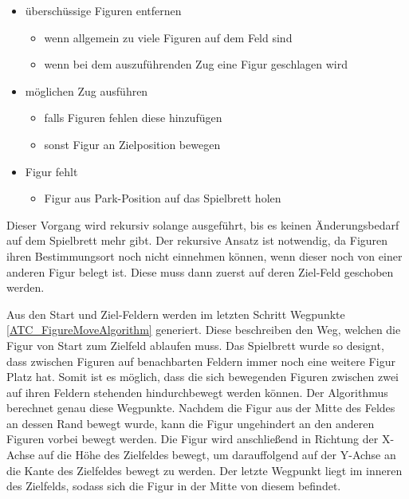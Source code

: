 \begin{itemize}
\tightlist
\item
  überschüssige Figuren entfernen

  \begin{itemize}
  \tightlist
  \item
    wenn allgemein zu viele Figuren auf dem Feld sind
  \item
    wenn bei dem auszuführenden Zug eine Figur geschlagen wird
  \end{itemize}
\item
  möglichen Zug ausführen

  \begin{itemize}
  \tightlist
  \item
    falls Figuren fehlen diese hinzufügen
  \item
    sonst Figur an Zielposition bewegen
  \end{itemize}
\item
  Figur fehlt

  \begin{itemize}
  \tightlist
  \item
    Figur aus Park-Position auf das Spielbrett holen
  \end{itemize}
\end{itemize}

Dieser Vorgang wird rekursiv solange ausgeführt, bis es keinen
Änderungsbedarf auf dem Spielbrett mehr gibt. Der rekursive Ansatz ist
notwendig, da Figuren ihren Bestimmungsort noch nicht einnehmen können,
wenn dieser noch von einer anderen Figur belegt ist. Diese muss dann
zuerst auf deren Ziel-Feld geschoben werden.

Aus den Start und Ziel-Feldern werden im letzten Schritt Wegpunkte
\ref{ATC_FigureMoveAlgorithm} generiert. Diese beschreiben den Weg,
welchen die Figur von Start zum Zielfeld ablaufen muss. Das Spielbrett
wurde so designt, dass zwischen Figuren auf benachbarten Feldern immer
noch eine weitere Figur Platz hat. Somit ist es möglich, dass die sich
bewegenden Figuren zwischen zwei auf ihren Feldern stehenden
hindurchbewegt werden können. Der Algorithmus berechnet genau diese
Wegpunkte. Nachdem die Figur aus der Mitte des Feldes an dessen Rand
bewegt wurde, kann die Figur ungehindert an den anderen Figuren vorbei
bewegt werden. Die Figur wird anschließend in Richtung der X-Achse auf
die Höhe des Zielfeldes bewegt, um darauffolgend auf der Y-Achse an die
Kante des Zielfeldes bewegt zu werden. Der letzte Wegpunkt liegt im
inneren des Zielfelds, sodass sich die Figur in der Mitte von diesem
befindet.

